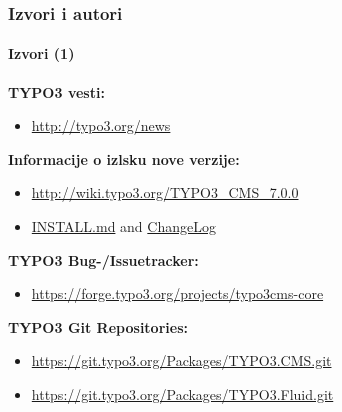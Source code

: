 \begin{frame}[fragile]
	\frametitle{Izvori i autori}
	\framesubtitle{Izvori (1)}

	\textbf{TYPO3 vesti:}
		\begin{itemize}\smaller
			\item \url{http://typo3.org/news}
		\end{itemize}

	\textbf{Informacije o izlsku nove verzije:}
		\begin{itemize}\smaller
			\item \url{http://wiki.typo3.org/TYPO3_CMS_7.0.0}
			\item \href{https://github.com/TYPO3/TYPO3.CMS/blob/master/INSTALL.md}{INSTALL.md} and \href{https://github.com/TYPO3/TYPO3.CMS/blob/master/ChangeLog}{ChangeLog}
		\end{itemize}

	\textbf{TYPO3 Bug-/Issuetracker:}
		\begin{itemize}\smaller
			\item \url{https://forge.typo3.org/projects/typo3cms-core}
		\end{itemize}

	\textbf{TYPO3 Git Repositories:}
		\begin{itemize}\smaller
			\item \url{https://git.typo3.org/Packages/TYPO3.CMS.git}
			\item \url{https://git.typo3.org/Packages/TYPO3.Fluid.git}
		\end{itemize}

\end{frame}


